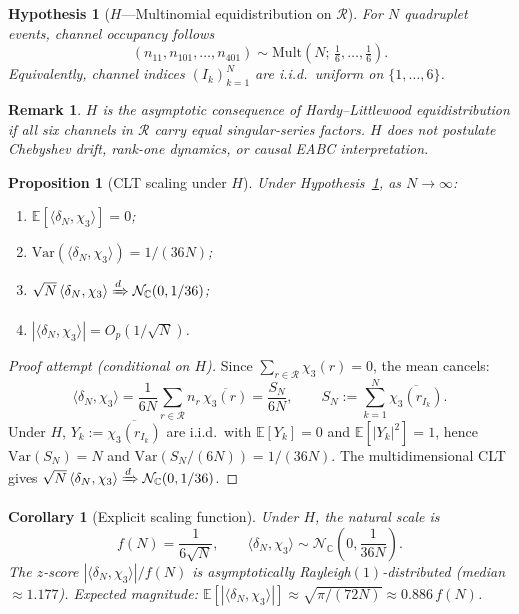 \documentclass[11pt,a4paper]{article}
\newtheorem{corollary}[theorem]{Corollary}
\newtheorem{proposition}[theorem]{Proposition}
\newtheorem{hypothesis}{Hypothesis}
\newtheorem{remark}{Remark}
\newcommand{\R}{\mathcal{R}}
\newcommand{\E}{\mathbb{E}}
\newcommand{\Var}{\mathrm{Var}}
\begin{document}
\begin{hypothesis}[$H$---Multinomial equidistribution on $\R$]
\label{hyp:H}
For $N$ quadruplet events, channel occupancy follows
\[
  (n_{11},n_{101},\ldots,n_{401}) \sim
  \mathrm{Mult}\!\left(N;\,\tfrac{1}{6},\ldots,\tfrac{1}{6}\right).
\]
Equivalently, channel indices $(I_k)_{k=1}^{N}$ are i.i.d.\ uniform on
$\{1,\ldots,6\}$.
\end{hypothesis}

\begin{remark}
$H$ is the asymptotic consequence of Hardy--Littlewood equidistribution
\emph{if} all six channels in $\R$ carry equal singular-series factors.
$H$ does not postulate Chebyshev drift, rank-one dynamics, or causal EABC
interpretation.
\end{remark}

\begin{proposition}[CLT scaling under $H$]
\label{prop:clt}
Under Hypothesis~\ref{hyp:H}, as $N\to\infty$:
\begin{enumerate}
  \item $\E[\langle\delta_N,\chi_3\rangle]=0$;
  \item $\Var(\langle\delta_N,\chi_3\rangle)=1/(36N)$;
  \item $\sqrt{N}\,\langle\delta_N,\chi_3\rangle
        \xRightarrow{d}\mathcal{N}_{\mathbb{C}}(0,1/36)$;
  \item $|\langle\delta_N,\chi_3\rangle|=O_p(1/\sqrt{N})$.
\end{enumerate}
\end{proposition}

\begin{proof}[Proof attempt (conditional on $H$)]
Since $\sum_{r\in\R}\chi_3(r)=0$, the mean cancels:
\[
  \langle\delta_N,\chi_3\rangle
  = \frac{1}{6N}\sum_{r\in\R} n_r\,\overline{\chi_3(r)}
  = \frac{S_N}{6N},
  \qquad
  S_N := \sum_{k=1}^{N}\overline{\chi_3(r_{I_k})}.
\]
Under $H$, $Y_k:=\overline{\chi_3(r_{I_k})}$ are i.i.d.\ with $\E[Y_k]=0$ and
$\E[|Y_k|^2]=1$, hence $\Var(S_N)=N$ and
$\Var(S_N/(6N))=1/(36N)$.
The multidimensional CLT gives
$\sqrt{N}\,\langle\delta_N,\chi_3\rangle\xRightarrow{d}\mathcal{N}_{\mathbb{C}}(0,1/36)$.
\end{proof}

\begin{corollary}[Explicit scaling function]
\label{cor:fN}
Under $H$, the natural scale is
\[
  \boxed{f(N)=\frac{1}{6\sqrt{N}},}
  \qquad
  \langle\delta_N,\chi_3\rangle
  \sim \mathcal{N}_{\mathbb{C}}\!\left(0,\frac{1}{36N}\right).
\]
The $z$-score $|\langle\delta_N,\chi_3\rangle|/f(N)$ is asymptotically
Rayleigh$(1)$-distributed (median $\approx 1.177$).
Expected magnitude:
$\E[|\langle\delta_N,\chi_3\rangle|]\approx\sqrt{\pi/(72N)}\approx 0.886\,f(N)$.
\end{corollary}
\end{document}
